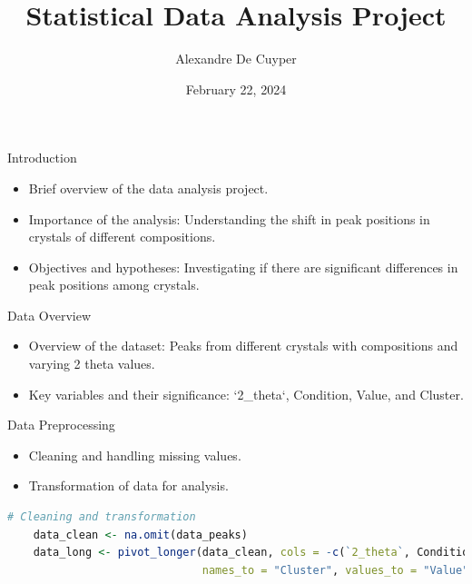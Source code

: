 \documentclass{beamer}
\title{Statistical Data Analysis Project}
\author{Alexandre De Cuyper}
\date{February 22, 2024}
\institute{University of A Coruña}
\begin{document}
\frame{\titlepage}

\begin{frame}{Introduction}
    \begin{itemize}
        \item Brief overview of the data analysis project.
        \item Importance of the analysis: Understanding the shift in peak positions in crystals of different compositions.
        \item Objectives and hypotheses: Investigating if there are significant differences in peak positions among crystals.
    \end{itemize}
\end{frame}

\begin{frame}{Data Overview}
    \begin{itemize}
        \item Overview of the dataset: Peaks from different crystals with compositions and varying 2 theta values.
        \item Key variables and their significance: `2_theta`, Condition, Value, and Cluster.
    \end{itemize}
\end{frame}

\begin{frame}[fragile]{Data Preprocessing}
    \begin{itemize}
        \item Cleaning and handling missing values.
        \item Transformation of data for analysis.
    \end{itemize}

    \begin{lstlisting}[language=R]
    # Cleaning and transformation
    data_clean <- na.omit(data_peaks)
    data_long <- pivot_longer(data_clean, cols = -c(`2_theta`, Condition), 
                              names_to = "Cluster", values_to = "Value")
    \end{lstlisting}
\end{frame}
\end{document}
